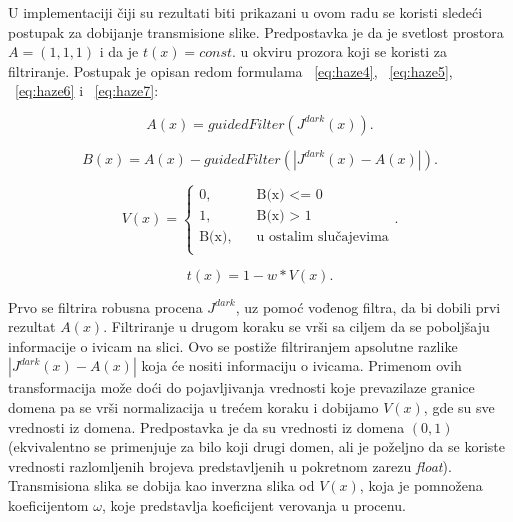 \documentclass[a4paper,12pt,titlepage]{article}
\begin{document}
U implementaciji čiji su rezultati biti prikazani u ovom radu se koristi sledeći postupak za dobijanje transmisione slike. Predpostavka je da je svetlost prostora $A = (1, 1, 1)$ i da je $t(x) = const.$ u okviru prozora koji se koristi za filtriranje. Postupak je opisan redom formulama ~\ref{eq:haze4}, ~\ref{eq:haze5}, ~\ref{eq:haze6} i ~\ref{eq:haze7}:

\begin{equation}\label{eq:haze4}
A(x) = guidedFilter(J^{dark}(x)).
\end{equation}

\begin{equation}\label{eq:haze5}
B(x) = A(x) - guidedFilter(|J^{dark}(x) - A(x)|).
\end{equation}

\begin{equation}\label{eq:haze6}
V(x) = 
     \begin{cases}
       \text{0,} &\quad\text{B(x) <= 0}\\
       \text{1,} &\quad\text{B(x) > 1} \\
       \text{B(x),} &\quad\text{u ostalim slučajevima}\\
     \end{cases}
. \end{equation}

\begin{equation}\label{eq:haze7}
t(x) = 1 - w * V(x).
\end{equation}

Prvo se filtrira robusna procena $J^{dark}$, uz pomoć vođenog filtra, da bi dobili prvi rezultat $A(x)$. Filtriranje u drugom koraku se vrši sa ciljem da se poboljšaju informacije o ivicam na slici. Ovo se postiže filtriranjem apsolutne razlike $|J^{dark}(x) - A(x)|$ koja će nositi informaciju o ivicama. Primenom ovih transformacija može doći do pojavljivanja vrednosti koje prevazilaze granice domena pa se vrši normalizacija u trećem koraku i dobijamo $V(x)$, gde su sve vrednosti iz domena. Predpostavka je da su vrednosti iz domena $(0, 1)$ (ekvivalentno se primenjuje za bilo koji drugi domen, ali je poželjno da se koriste vrednosti razlomljenih brojeva predstavljenih u pokretnom zarezu \emph{float}). Transmisiona slika se dobija kao inverzna slika od $V(x)$, koja je pomnožena koeficijentom $\omega$, koje predstavlja koeficijent verovanja u procenu.
\end{document}
